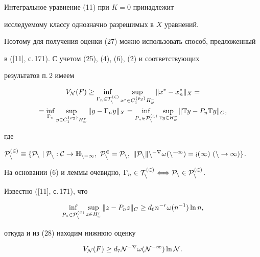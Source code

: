 \begin{pf} 


Интегральное уравнение (11) при $K=0$ принадлежит 


исследуемому классу однозначно разрешимых в $X$ уравнений. 


Поэтому для получения оценки (27) можно использовать способ, предложенный 


в ([11], с.\,171). С учетом (25), (4), (6), (2) и соответствующих 


результатов п.\,2 имеем 


\begin{multline} 


V_{\cal N}(F)\ge\inf_{\Gamma_n\in\cal T^{(2)}_n} 


\sup_{x^*\in C^{\{p_2\}}_1H^r_\omega}\|x^*-x^*_n\|_X= \\ 


% 


=\inf_{\Gamma_n}\sup_{y\in C^{\{p_2\}}_1H^r_\omega} 


\|y-\Gamma_n y\|_X=\inf_{P_n\in\cal P^{(2)}_n} 


\sup_{\Bbb T y\in H^r_\omega}\|\Bbb T y-P_n\Bbb T y\|_C, 


\end{multline} 


где


$\cal P^{(2)}_n\equiv


\{P_n\mid P_n:C\to\Bbb H_{n-1},\ P^2_n=P_n,\ 


\|P_n\|n^{-r}\omega(n^{-1})=o(1)\ (n\to\infty)\}$. 


На основании (6) и леммы очевидно, $\Gamma_n\in\cal 


T^{(2)}_n\Longleftrightarrow P_n\in\cal P^{(2)}_n$. 


Известно ([11], с.\,171), что 


$$ 


\inf_{P_n\in\cal P^{(2)}_n}\sup_{z\in H^r_\omega} 


\|z-P_n z\|_C\ge d_6 n^{-r}\omega(n^{-1})\ln n, 


$$ 


откуда и из (28) находим нижнюю оценку 


\begin{equation} 


V_{\cal N}(F)\ge d_7\cal N^{-r}\omega(\cal N^{-1})\ln\cal N. 


\end{equation} 


 



\end{pf}
